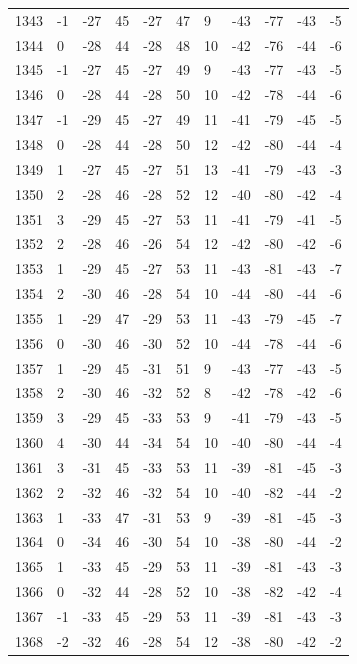 \begin{table}[H]
\begin{tabular}{lllllllllll}
1343 & -1 & -27 & 45 & -27 & 47 & 9 & -43 & -77 & -43 & -5 \\
1344 & 0 & -28 & 44 & -28 & 48 & 10 & -42 & -76 & -44 & -6 \\
1345 & -1 & -27 & 45 & -27 & 49 & 9 & -43 & -77 & -43 & -5 \\
1346 & 0 & -28 & 44 & -28 & 50 & 10 & -42 & -78 & -44 & -6 \\
1347 & -1 & -29 & 45 & -27 & 49 & 11 & -41 & -79 & -45 & -5 \\
1348 & 0 & -28 & 44 & -28 & 50 & 12 & -42 & -80 & -44 & -4 \\
1349 & 1 & -27 & 45 & -27 & 51 & 13 & -41 & -79 & -43 & -3 \\
1350 & 2 & -28 & 46 & -28 & 52 & 12 & -40 & -80 & -42 & -4 \\
1351 & 3 & -29 & 45 & -27 & 53 & 11 & -41 & -79 & -41 & -5 \\
1352 & 2 & -28 & 46 & -26 & 54 & 12 & -42 & -80 & -42 & -6 \\
1353 & 1 & -29 & 45 & -27 & 53 & 11 & -43 & -81 & -43 & -7 \\
1354 & 2 & -30 & 46 & -28 & 54 & 10 & -44 & -80 & -44 & -6 \\
1355 & 1 & -29 & 47 & -29 & 53 & 11 & -43 & -79 & -45 & -7 \\
1356 & 0 & -30 & 46 & -30 & 52 & 10 & -44 & -78 & -44 & -6 \\
1357 & 1 & -29 & 45 & -31 & 51 & 9 & -43 & -77 & -43 & -5 \\
1358 & 2 & -30 & 46 & -32 & 52 & 8 & -42 & -78 & -42 & -6 \\
1359 & 3 & -29 & 45 & -33 & 53 & 9 & -41 & -79 & -43 & -5 \\
1360 & 4 & -30 & 44 & -34 & 54 & 10 & -40 & -80 & -44 & -4 \\
1361 & 3 & -31 & 45 & -33 & 53 & 11 & -39 & -81 & -45 & -3 \\
1362 & 2 & -32 & 46 & -32 & 54 & 10 & -40 & -82 & -44 & -2 \\
1363 & 1 & -33 & 47 & -31 & 53 & 9 & -39 & -81 & -45 & -3 \\
1364 & 0 & -34 & 46 & -30 & 54 & 10 & -38 & -80 & -44 & -2 \\
1365 & 1 & -33 & 45 & -29 & 53 & 11 & -39 & -81 & -43 & -3 \\
1366 & 0 & -32 & 44 & -28 & 52 & 10 & -38 & -82 & -42 & -4 \\
1367 & -1 & -33 & 45 & -29 & 53 & 11 & -39 & -81 & -43 & -3 \\
1368 & -2 & -32 & 46 & -28 & 54 & 12 & -38 & -80 & -42 & -2 \\

\end{tabular}
\end{table}
